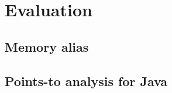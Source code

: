 \section{Evaluation}
\label{sec:evaluation}
\subsection{Memory alias}
\subsection{Points-to analysis for Java}
